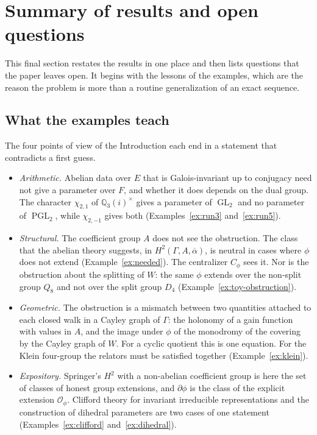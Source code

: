 \documentclass[12pt,letterpaper]{article}
\numberwithin{equation}{section}
\theoremstyle{plain}
\theoremstyle{definition}
\newcommand{\Q}{\mathbb{Q}}
\DeclareMathOperator{\GL}{GL}
\DeclareMathOperator{\PGL}{PGL}
\begin{document}
\section{Summary of results and open questions}\label{sec:questions}

This final section restates the results in one place and then lists
questions that the paper leaves open. It begins with the lessons of the
examples, which are the reason the problem is more than a routine
generalization of an exact sequence.

\subsection{What the examples teach}

The four points of view of the Introduction each end in a statement that
contradicts a first guess.
\begin{itemize}[itemsep=2pt]
\item \emph{Arithmetic.} Abelian data over $E$ that is Galois-invariant
up to conjugacy need not give a parameter over $F$, and whether it does
depends on the dual group. The character $\chi_{2,1}$ of $\Q_3(i)^\times$
gives a parameter of $\GL_2$ and no parameter of $\PGL_2$, while
$\chi_{2,-1}$ gives both (Examples~\ref{ex:run3} and~\ref{ex:run5}).
\item \emph{Structural.} The coefficient group $A$ does not see the
obstruction. The class that the abelian theory suggests, in
$H^2(\Gamma,A,\overline{\alpha})$, is neutral in cases where $\phi$ does
not extend (Example~\ref{ex:needed}). The centralizer $C_\phi$ sees it.
Nor is the obstruction about the splitting of $W$: the same $\phi$
extends over the non-split group $Q_8$ and not over the split group
$D_4$ (Example~\ref{ex:toy-obstruction}).
\item \emph{Geometric.} The obstruction is a mismatch between two
quantities attached to each closed walk in a Cayley graph of $\Gamma$:
the holonomy of a gain function with values in $A$, and the image under
$\phi$ of the monodromy of the covering by the Cayley graph of $W$. For
a cyclic quotient this is one equation. For the Klein four-group the
relators must be satisfied together (Example~\ref{ex:klein}).
\item \emph{Expository.} Springer's $H^2$ with a non-abelian coefficient
group is here the set of classes of honest group extensions, and
$\partial\phi$ is the class of the explicit extension
$\mathcal{O}_\phi$. Clifford theory for invariant irreducible
representations and the construction of dihedral parameters are two
cases of one statement (Examples~\ref{ex:clifford}
and~\ref{ex:dihedral}).
\end{itemize}
\end{document}

